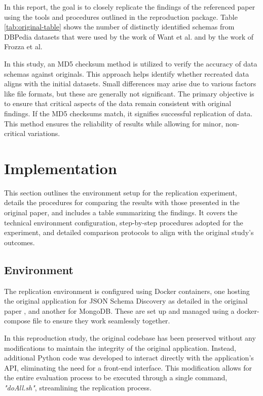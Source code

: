 \documentclass[sigconf, nonacm]{acmart}
\begin{document}
In this report, the goal is to closely replicate the findings of the referenced paper using the tools and procedures outlined in the reproduction package. Table \ref{tab:original-table} shows the number of distinctly identified schemas from DBPedia datasets that were used by the work of Want et al. \cite{WangSchemaManagement} and by the work of Frozza et al. \cite{JsonSchemaDiscovery}

In this study, an MD5 checksum method is utilized to verify the accuracy of data schemas against originals. This approach helps identify whether recreated data aligns with the initial datasets. Small differences may arise due to various factors like file formats, but these are generally not significant. The primary objective is to ensure that critical aspects of the data remain consistent with original findings. If the MD5 checksums match, it signifies successful replication of data. This method ensures the reliability of results while allowing for minor, non-critical variations.


\section{Implementation}
This section outlines the environment setup for the replication experiment, details the procedures for comparing the results with those presented in the original paper, and includes a table summarizing the findings. It covers the technical environment configuration, step-by-step procedures adopted for the experiment, and detailed comparison protocols to align with the original study's outcomes.

\subsection{Environment}
The replication environment is configured using Docker containers, one hosting the original application for JSON Schema Discovery as detailed in the original paper \cite{JsonSchemaDiscovery}, and another for MongoDB. These are set up and managed using a docker-compose file to ensure they work seamlessly together.

In this reproduction study, the original codebase has been preserved without any modifications to maintain the integrity of the original application. Instead, additional Python code was developed to interact directly with the application's API, eliminating the need for a front-end interface. This modification allows for the entire evaluation process to be executed through a single command, \textit{"doAll.sh"}, streamlining the replication process.
\end{document}
